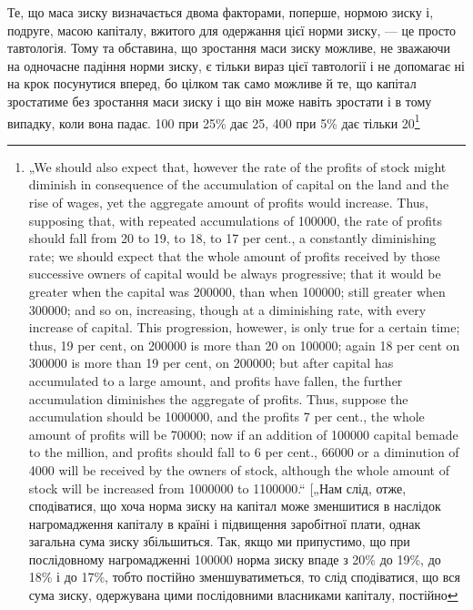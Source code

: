 Те, що маса зиску визначається двома факторами, поперше,
нормою зиску і, подруге, масою капіталу, вжитого для одержання
цієї норми зиску, — це просто тавтологія. Тому та обставина,
що зростання маси зиску можливе, не зважаючи на одночасне
падіння норми зиску, є тільки вираз цієї тавтології і
не допомагає ні на крок посунутися вперед, бо цілком так само
можливе й те, що капітал зростатиме без зростання маси зиску
і що він може навіть зростати і в тому випадку, коли вона
падає. 100 при 25\% дає 25, 400 при 5\% дає тільки 20\footnote{
„We should also expect that, however the rate of the profits of stock
might diminish in consequence of the accumulation of capital on the land and the
rise of wages, yet the aggregate amount of profits would increase. Thus, supposing
that, with repeated accumulations of \num{100000}, the rate of profits should fall from
20 to 19, to 18, to 17 per cent., a constantly diminishing rate; we should expect that
the whole amount of profits received by those successive owners of capital would be
always progressive; that it would be greater when the capital was \num{200000}, than
when \num{100000}; still greater when \num{300000}; and so on, increasing, though at a
diminishing rate, with every increase of capital. This progression, howewer, is only
true for a certain time; thus, 19 per cent, on \num{200000} is more than 20 on \num{100000};
again 18 per cent on \num{300000} is more than 19 per cent, on \num{200000}; but after
capital has accumulated to a large amount, and profits have fallen, the further
accumulation diminishes the aggregate of profits. Thus, suppose the accumulation
should be \num{1000000}, and the profits 7 per cent., the whole amount of profits will be
\num{70000}; now if an addition of \num{100000} capital bemade to the million, and profits should
fall to 6 per cent., \num{66000} or a diminution of 4000 will be received by the owners
of stock, although the whole amount of stock will be increased from \num{1000000} to
\num{1100000}.“ [„Нам слід, отже, сподіватися, що хоча норма зиску на капітал може
зменшитися в наслідок нагромадження капіталу в країні і підвищення заробітної
плати, однак загальна сума зиску збільшиться. Так, якщо ми припустимо, що при
послідовному нагромадженні \num{100000} норма зиску впаде з 20\% до
19\%, до 18\% і до 17\%, тобто постійно зменшуватиметься, то слід сподіватися,
що вся сума зиску, одержувана цими послідовними власниками капіталу, постійно
}

